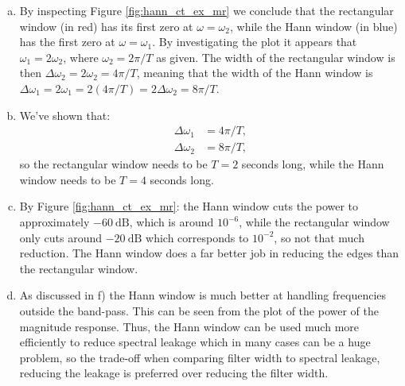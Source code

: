 \begin{enumerate}
\begin{enumerate}[a)]
\item By inspecting Figure \ref{fig:hann_ct_ex_mr} we conclude that the rectangular window (in red) 
has its first zero at $\omega=\omega_{2}$, while the Hann window (in blue) has the first zero at $\omega=\omega_{1}$. 
By investigating the plot it appears that $\omega_{1}=2\omega_{2}$, where $\omega_{2}=2\pi /T$ as given. 
The width of the rectangular window is then $\Delta\omega_{2}=2\omega_{2}=4\pi/T$, meaning that the 
width of the Hann window is $\Delta\omega_{1}=2\omega_{1}=2(4\pi/T)=2\Delta\omega_{2}=8\pi /T$. 

\item We've shown that:
\begin{align*}
    \Delta\omega_{1}&=4\pi/T, \\
    \Delta\omega_{2}&=8\pi/T,
\end{align*}
so the rectangular window needs to be $T=2$ seconds long, while the Hann window needs to be $T=4$ seconds long. 

\item By Figure \ref{fig:hann_ct_ex_mr}: the Hann window cuts the power to approximately $-60\ \text{dB}$, 
which is around $10^{-6}$, while the rectangular window only cuts around $-20\ \text{dB}$ which corresponds to $10^{-2}$, so not that much reduction. The Hann window does a far better job in reducing the edges than the rectangular window.

\item As discussed in f) the Hann window is much better at handling frequencies outside the band-pass. 
This can be seen from the plot of the power of the magnitude response. Thus, the Hann window can be used much more efficiently
 to reduce spectral leakage which in many cases can be a huge problem, so the trade-off when comparing filter width to spectral 
 leakage, reducing the leakage is preferred over reducing the filter width.


\end{enumerate}
\end{enumerate}